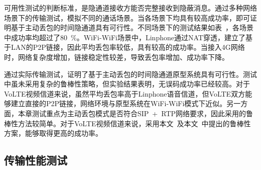 
可用性测试的判断标准，是隐通道接收方能否完整接收到隐蔽消息。通过多种网络场景下的传输测试，模拟不同的通话场景。当各场景下均具有较高成功率，即可证明基于主动丢包的时间隐通道具有可行性。不同场景下的测试结果如表\ ，各场景中成功率均超过了{80\ \%}。WiFi-WiFi场景中，Linphone通过NAT穿透，建立了基于LAN的P2P链接，因此平均丢包率较低，具有较高的成功率。当接入4G网络时，网络复杂度增加，链接稳定性较差，导致丢包率增加、成功率下降。

通过实际传输测试，证明了基于主动丢包的时间隐通道原型系统具有可行性。测试中虽未采用复杂的鲁棒性策略，但实验结果表明，无误码成功率已经较高。对于VoLTE视频信道来说，虽然平均丢包率高于Linphone语音信道，但VoLTE双方能够建立直接的P2P链接，网络环境与原型系统在WiFi-WiFi模式下近似。另一方面，本章测试重点为主动丢包模式是否符合SIP\ +\ RTP网络要求，因此采用的鲁棒性方法较简单。对于VoLTE视频信道来说，采用本文\ 及本文\ 中提出的鲁棒性方案，能够取得更高的成功率。

\subsection{传输性能测试}
\label{chap:linphone:result:throughput}

